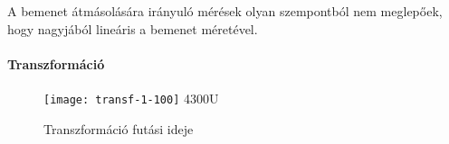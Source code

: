 A bemenet \'atm\'asol\'as\'ara ir\'anyul\'o m\'er\'esek olyan szempontb\'ol nem meglep\H oek, hogy nagyj\'ab\'ol line\'aris a bemenet m\'eret\'evel.

\paragraph{Transzform\'aci\'o}

\begin{figure}[h]
	\texttt{[image: transf-1-100]}
	{4300U}
	\centering
	\caption{Transzform\'aci\'o fut\'asi ideje}
\end{figure}

